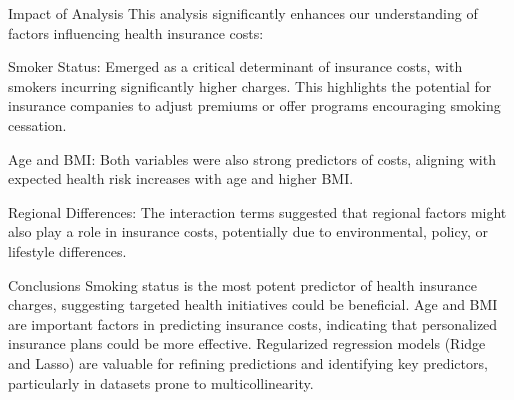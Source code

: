 \documentclass[
  12pt,
]{article}
\begin{document}
Impact of Analysis This analysis significantly enhances our
understanding of factors influencing health insurance costs:

Smoker Status: Emerged as a critical determinant of insurance costs,
with smokers incurring significantly higher charges. This highlights the
potential for insurance companies to adjust premiums or offer programs
encouraging smoking cessation.

Age and BMI: Both variables were also strong predictors of costs,
aligning with expected health risk increases with age and higher BMI.

Regional Differences: The interaction terms suggested that regional
factors might also play a role in insurance costs, potentially due to
environmental, policy, or lifestyle differences.

Conclusions Smoking status is the most potent predictor of health
insurance charges, suggesting targeted health initiatives could be
beneficial. Age and BMI are important factors in predicting insurance
costs, indicating that personalized insurance plans could be more
effective. Regularized regression models (Ridge and Lasso) are valuable
for refining predictions and identifying key predictors, particularly in
datasets prone to multicollinearity.
\end{document}

